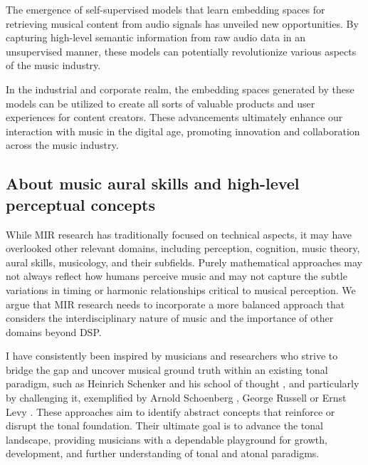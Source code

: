 The emergence of self-supervised models that learn embedding spaces for retrieving musical content from audio signals has unveiled new opportunities. By capturing high-level semantic information from raw audio data in an unsupervised manner, these models can potentially revolutionize various aspects of the music industry.

In the industrial and corporate realm, the embedding spaces generated by these models can be utilized to create all sorts of valuable products and user experiences for content creators. These advancements ultimately enhance our interaction with music in the digital age, promoting innovation and collaboration across the music industry.

\subsection{About music aural skills and high-level perceptual concepts}

While MIR research has traditionally focused on technical aspects, it may have overlooked other relevant domains, including perception, cognition, music theory, aural skills, musicology, and their subfields. Purely mathematical approaches may not always reflect how humans perceive music and may not capture the subtle variations in timing or harmonic relationships critical to musical perception. We argue that MIR research needs to incorporate a more balanced approach that considers the interdisciplinary nature of music and the importance of other domains beyond DSP.

I have consistently been inspired by musicians and researchers who strive to bridge the gap and uncover musical ground truth within an existing tonal paradigm, such as Heinrich Schenker and his school of thought \cite{Komar1959SchenkersStructure}, and particularly by challenging it, exemplified by Arnold Schoenberg \cite{Samson1974SchoenbergsMusic}, George Russell \cite{LydianRussell} or Ernst Levy \cite{LevyAHarmony}. These approaches aim to identify abstract concepts that reinforce or disrupt the tonal foundation. Their ultimate goal is to advance the tonal landscape, providing musicians with a dependable playground for growth, development, and further understanding of tonal and atonal paradigms.


